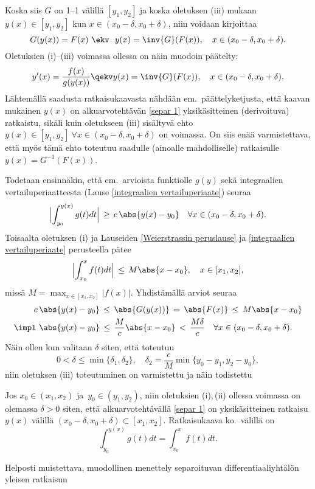 Koska siis $G$ on 1--1 välillä $[y_1,y_2]$ ja koska oletuksen (iii) mukaan $y(x)\in[y_1,y_2]$
kun $x\in(x_0-\delta,x_0+\delta)$, niin voidaan kirjoittaa
\[
G(y(x))=F(x) \ \ekv \ y(x)=\inv{G}(F(x)),\quad x\in(x_0-\delta,x_0+\delta).
\]
Oletuksien (i)--(iii) voimassa ollessa on näin muodoin päätelty:
\[
y'(x)=\frac{f(x)}{g(y(x))} \qekv y(x)=\inv{G}(F(x)),\quad x\in(x_0-\delta,x_0+\delta).
\]
Lähtemällä saadusta ratkaisukaavasta nähdään em.\ päättelyketjusta, että kaavan mukainen
$y(x)$ on alkuarvotehtävän \eqref{separ 1} yksikäsitteinen (derivoituva) ratkaistu, sikäli kuin
oletukseen (iii) sisältyvä ehto $y(x)\in[y_1,y_2]\ \forall x\in(x_0-\delta,x_0+\delta)$ on 
voimassa. On siis enää varmistettava, että myös tämä ehto toteutuu saadulle (ainoalle 
mahdolliselle) ratkaisulle $y(x)=G^{-1}(F(x))$.

Todetaan ensinnäkin, että em.\ arvioista funktiolle $g(y)$ sekä integraalien 
vertailuperiaatteesta (Lause \ref{integraalien vertailuperiaate}) seuraa
\[
\Bigl|\int_{y_0}^{y(x)} g(t)dt\Bigr| \,\ge\, c\,\abs{y(x)-y_0} \quad 
                                            \forall x\in (x_0-\delta,x_0+\delta).
\]
Toisaalta oletuksen (i) ja Lauseiden \ref{Weierstrassin peruslause} ja
\ref{integraalien vertailuperiaate} perusteella pätee
\[
\Bigl|\int_{x_0}^x f(t)dt\Bigr|\,\le\,M\abs{x-x_0}, \quad x\in[x_1,x_2],
\]
missä $M=\max_{x\in[x_1,x_2]}|f(x)|$. Yhdistämällä arviot seuraa
\begin{align*}
c\,\abs{y(x)-y_0}        &\,\le\, \abs{G(y(x))} \,=\, \abs{F(x)} \,\le\, M\abs{x-x_0} \\
  \impl \ \abs{y(x)-y_0} &\,\le\, \frac{M}{c}\abs{x-x_0} \,<\, \frac{M\delta}{c}
                                                   \quad \forall x\in (x_0-\delta,x_0+\delta).
\end{align*}
Näin ollen kun valitaan $\delta$ siten, että toteutuu
\[
0<\delta\le\min\{\delta_1,\delta_2\}, \quad \delta_2 = \frac{c}{M}\min \{y_0-y_1,y_2-y_0\},
\]
niin oletuksen (iii) toteutuminen on varmistettu ja näin todistettu
\begin{Lause} \label{separoituvan DY:n ratkaisu} 
Jos $x_0\in (x_1,x_2)$ ja $\,y_0\in (y_1,y_2)$,
niin oletuksien (i),\,(ii) ollessa voimassa on olemassa $\delta>0$ siten, että 
alkuarvotehtävällä \eqref{separ 1} on yksikäsitteinen ratkaisu $y(x)$ välillä 
$(x_0-\delta,x_0+\delta)\subset [x_1,x_2]$. Ratkaisukaava ko.\ välillä on
\[
\int_{y_0}^{y(x)} g(t)dt = \int_{x_0}^x f(t)dt.
\]
\end{Lause}
Helposti muistettava, muodollinen menettely separoituvan differentiaaliyhtälön yleisen ratkaisun
